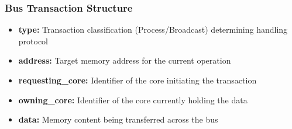 \documentclass[10pt]{article}
\begin{document}
\subsubsection{Bus Transaction Structure}
\begin{itemize}
    \item \textbf{type:} Transaction classification (Process/Broadcast) determining handling protocol
    \item \textbf{address:} Target memory address for the current operation
    \item \textbf{requesting\_core:} Identifier of the core initiating the transaction
    \item \textbf{owning\_core:} Identifier of the core currently holding the data
    \item \textbf{data:} Memory content being transferred across the bus
\end{itemize}

\newpage
\end{document}
